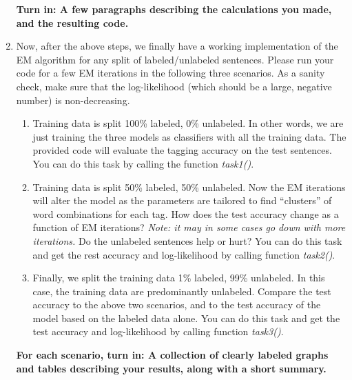 \begin{enumerate}
\textbf{Turn in: A few paragraphs describing the calculations you made, and the
resulting code.}

\item Now, after the above steps, we finally have a working implementation of the EM algorithm for any split of labeled/unlabeled sentences. Please run your code for a few EM iterations in the following three scenarios. As a sanity check, make sure that
the log-likelihood (which should be a large, negative number) is non-decreasing.
\begin{enumerate}
\item Training data is split 100\% labeled, 0\% unlabeled. In other words, we are just training the three models as classifiers with all the training data. The provided 
code will evaluate the tagging accuracy on the test sentences. You can do this task
by calling the function \textit{task1()}. 



\item Training data is split 50\% labeled, 50\% unlabeled. Now the EM iterations will alter the model as the parameters are tailored to find ``clusters'' of word combinations for each tag. How does the test accuracy change as a function of EM iterations? 
\textit{Note: it may in some cases go down with more iterations.} 
Do the unlabeled sentences help or hurt?  You can do this task and get the rest accuracy
and log-likelihood by calling function \textit{task2()}.

\item Finally, we split the training data 1\% labeled, 99\% unlabeled. In this case, the training data are predominantly unlabeled. Compare the test accuracy to the above two scenarios, and to the test accuracy of the model based on the labeled data alone. 
You can do this task and get the test accuracy and log-likelihood by calling function
\textit{task3()}.
\end{enumerate}

\textbf{For each scenario, turn in: A collection of clearly labeled graphs and tables describing your
results, along with a short summary.}


\end{enumerate}
